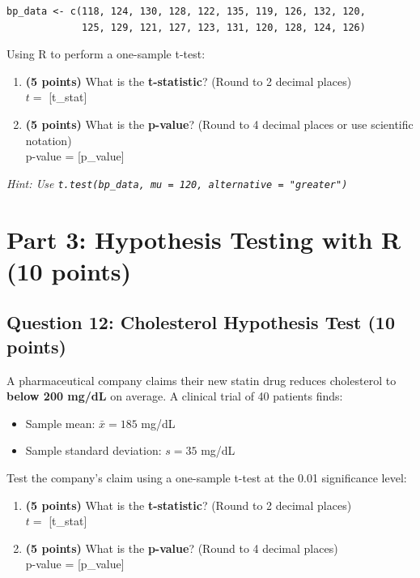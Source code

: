 \documentclass[11pt]{article}
\begin{document}
\begin{verbatim}
bp_data <- c(118, 124, 130, 128, 122, 135, 119, 126, 132, 120,
             125, 129, 121, 127, 123, 131, 120, 128, 124, 126)
\end{verbatim}

Using R to perform a one-sample t-test:

\begin{enumerate}[label=\alph*)]
\item \textbf{(5 points)} What is the \textbf{t-statistic}? (Round to 2 decimal places)\\[0.3cm]
$t = $ [t\_stat]

\item \textbf{(5 points)} What is the \textbf{p-value}? (Round to 4 decimal places or use scientific notation)\\[0.3cm]
p-value = [p\_value]
\end{enumerate}

\textit{Hint: Use \texttt{t.test(bp\_data, mu = 120, alternative = "greater")}}

\vspace{1cm}

\newpage

\section{Part 3: Hypothesis Testing with R (10 points)}

\subsection*{Question 12: Cholesterol Hypothesis Test (10 points)}

A pharmaceutical company claims their new statin drug reduces cholesterol to \textbf{below 200 mg/dL} on average. A clinical trial of 40 patients finds:

\begin{itemize}
\item Sample mean: $\bar{x} = 185$ mg/dL
\item Sample standard deviation: $s = 35$ mg/dL
\end{itemize}

Test the company's claim using a one-sample t-test at the 0.01 significance level:

\begin{enumerate}[label=\alph*)]
\item \textbf{(5 points)} What is the \textbf{t-statistic}? (Round to 2 decimal places)\\[0.3cm]
$t = $ [t\_stat]

\item \textbf{(5 points)} What is the \textbf{p-value}? (Round to 4 decimal places)\\[0.3cm]
p-value = [p\_value]
\end{enumerate}
\end{document}
